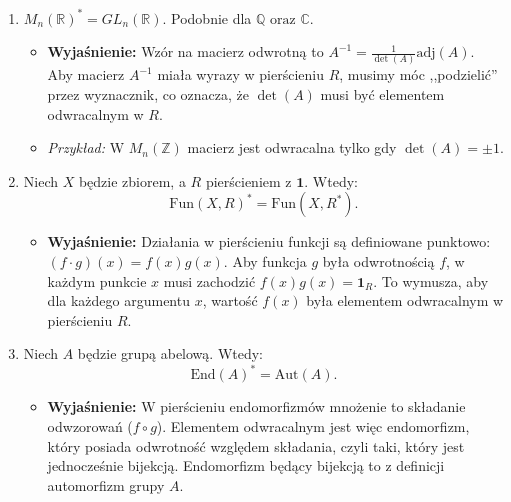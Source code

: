 \begin{enumerate}[label=\arabic*)]
    Ponadto wyróżniamy podgrupę \textit{Specjalną Grupę Liniową}:
    \[
        SL_{n}(R) = \{A \in GL_{n}(R) : \det(A) = \mathbf{1}\}.
    \]
    Zauważmy, że $SL_{n}(R) \unlhd GL_{n}(R)$. Grupa ilorazowa przez centrum to \textit{Projective Special Linear Group}:
    \[
        PSL_{n}(R) := SL_{n}(R) \big/ Z(SL_{n}(R)).
    \]
    \item $M_{n}\left( \mathbb{R}  \right) ^{\ast} = GL_{n}\left( \mathbb{R}  \right) $. Podobnie dla $\mathbb{Q} \text{ oraz }\mathbb{C} $.
    \begin{itemize}
        \item \textbf{Wyjaśnienie:} Wzór na macierz odwrotną to $A^{-1} = \frac{1}{\det(A)} \text{adj}(A)$. Aby macierz $A^{-1}$ miała wyrazy w pierścieniu $R$, musimy móc ,,podzielić'' przez wyznacznik, co oznacza, że $\det(A)$ musi być elementem odwracalnym w $R$. 
        \item \textit{Przykład:} W $M_n(\mathbb{Z})$ macierz jest odwracalna tylko gdy $\det(A) = \pm 1$.
    \end{itemize}

    \item Niech $X$ będzie zbiorem, a $R$ pierścieniem z $\mathbf{1}$. Wtedy:
    \[ \text{Fun}(X,R)^{\ast} = \text{Fun}(X, R^{\ast}). \]
     \begin{itemize}
        \item \textbf{Wyjaśnienie:} Działania w pierścieniu funkcji są definiowane punktowo: $(f \cdot g)(x) = f(x)g(x)$. Aby funkcja $g$ była odwrotnością $f$, w każdym punkcie $x$ musi zachodzić $f(x)g(x) = \mathbf{1}_R$. To wymusza, aby dla każdego argumentu $x$, wartość $f(x)$ była elementem odwracalnym w pierścieniu $R$.
    \end{itemize}

    \item Niech $A$ będzie grupą abelową. Wtedy:
    \[ \text{End}(A)^{\ast} = \text{Aut}(A). \]
    \begin{itemize}
        \item \textbf{Wyjaśnienie:} W pierścieniu endomorfizmów mnożenie to składanie odwzorowań ($f \circ g$). Elementem odwracalnym jest więc endomorfizm, który posiada odwrotność względem składania, czyli taki, który jest jednocześnie bijekcją. Endomorfizm będący bijekcją to z definicji automorfizm grupy $A$.
    \end{itemize}
\end{enumerate}

